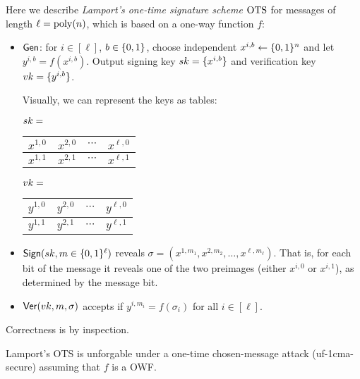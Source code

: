 \documentclass[11pt]{article}
\begin{document}
Here we describe \emph{Lamport's one-time signature scheme} $\text{OTS}$ for
messages of length $\ell = \operatorname{poly}(n)$, which is based on a one-way
function $f$:
\begin{itemize}
\item $\mathsf{Gen}$: for $i \in [\ell]$, $b \in \{0,1\}$, choose independent
  $x^{i,b} \gets \{0,1\}^n$ and let $y^{i,b} = f(x^{i,b})$.  Output
  signing key $sk = \{x^{i,b}\}$ and verification key $vk =
  \{y^{i,b}\}$.

  Visually, we can represent the keys as tables:

  \renewcommand{\arraystretch}{1.2}
  $sk = $ \begin{tabular}{|c|c|c|c|}
    \hline
    $x^{1,0}$ & $x^{2,0}$ & $\cdots$ & $x^{\ell,0}$ \\ \hline
    $x^{1,1}$ & $x^{2,1}$ & $\cdots$ & $x^{\ell,1}$ \\ \hline
  \end{tabular}
  \qquad $vk = $
  \begin{tabular}{|c|c|c|c|}
    \hline
    $y^{1,0}$ & $y^{2,0}$ & $\cdots$ & $y^{\ell,0}$ \\ \hline
    $y^{1,1}$ & $y^{2,1}$ & $\cdots$ & $y^{\ell,1}$ \\ \hline
  \end{tabular}

\item $\mathsf{Sign}(sk,m \in \{0,1\}^{\ell})$ reveals
  $\sigma=(x^{1,m_1},x^{2,m_2},\ldots,x^{\ell,m_{\ell}})$.  That is,
  for each bit of the message it reveals one of the two preimages
  (either $x^{i,0}$ or $x^{i,1}$), as determined by the message bit.

\item $\mathsf{Ver}(vk,m,\sigma)$ accepts if $y^{i,m_i} = f(\sigma_i)$ for
  all $i \in [\ell]$.
\end{itemize}

\noindent Correctness is by inspection.

\begin{theorem}
  \label{thm:ots-1cma}
  Lamport's OTS is unforgable under a one-time chosen-message attack
  (uf-1cma-secure) assuming that $f$ is a OWF.
\end{theorem}
\end{document}
